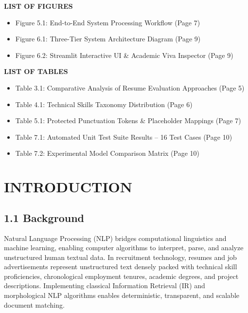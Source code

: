 \documentclass[11pt,a4paper]{article}
\begin{document}
\vspace{0.3cm}
\noindent\textbf{LIST OF FIGURES}
\begin{itemize}[noitemsep]
    \item Figure 5.1: End-to-End System Processing Workflow (Page 7)
    \item Figure 6.1: Three-Tier System Architecture Diagram (Page 9)
    \item Figure 6.2: Streamlit Interactive UI \& Academic Viva Inspector (Page 9)
\end{itemize}

\noindent\textbf{LIST OF TABLES}
\begin{itemize}[noitemsep]
    \item Table 3.1: Comparative Analysis of Resume Evaluation Approaches (Page 5)
    \item Table 4.1: Technical Skills Taxonomy Distribution (Page 6)
    \item Table 5.1: Protected Punctuation Tokens \& Placeholder Mappings (Page 7)
    \item Table 7.1: Automated Unit Test Suite Results -- 16 Test Cases (Page 10)
    \item Table 7.2: Experimental Model Comparison Matrix (Page 10)
\end{itemize}

\newpage

\section{INTRODUCTION}

\subsection{1.1 Background}
Natural Language Processing (NLP) bridges computational linguistics and machine learning, enabling computer algorithms to interpret, parse, and analyze unstructured human textual data. In recruitment technology, resumes and job advertisements represent unstructured text densely packed with technical skill proficiencies, chronological employment tenures, academic degrees, and project descriptions. Implementing classical Information Retrieval (IR) and morphological NLP algorithms enables deterministic, transparent, and scalable document matching.
\end{document}
